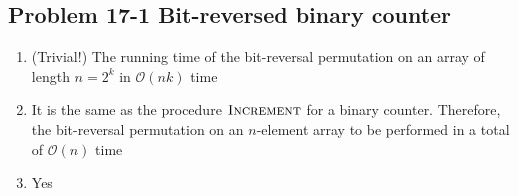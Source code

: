 \subsection*{Problem 17-1 Bit-reversed binary counter}
\begin{enumerate}
	\item	(Trivial!) The running time of the bit-reversal permutation on an array of length $n = 2^k$ in $\mathcal{O}(nk)$ time
	\item	It is the same as the procedure $\textnormal{\scshape Increment}$ for a binary counter. Therefore, the bit-reversal permutation on an $n$-element array to be performed in a total of $\mathcal{O}(n)$ time
	\item	Yes
\end{enumerate}

